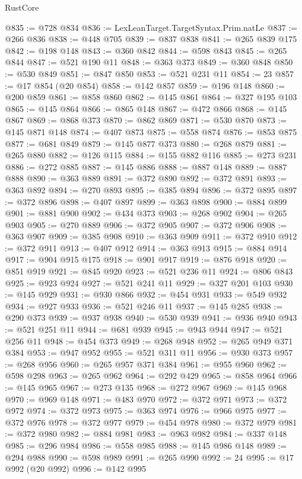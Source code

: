 \begin{lexlean}{RustCore}
\begin{coremodule}
@835 := @728 @834
@836 := LexLeanTarget.TargetSyntax.Prim.natLe
@837 := @266 @836
@838 := @448 @705
@839 := @837 @838
@841 := @265 @839 @175
@842 := @198 @148
@843 := @360 @842
@844 := @598 @843
@845 := @265 @844
@847 := @521 @190 @11
@848 := @363 @373
@849 := @360 @848
@850 := @530 @849
@851 := @847 @850
@853 := @521 @231 @11
@854 := 23
@857 := @17 @854 (@20 @854)
@858 := @142 @857
@859 := @196 @148
@860 := @200 @859
@861 := @858 @860
@862 := @145 @861
@864 := @327 @195 @103
@865 := @145 @864
@866 := @865 @148
@867 := @472 @866
@868 := @145 @867
@869 := @868 @373
@870 := @862 @869
@871 := @530 @870
@873 := @145 @871 @148
@874 := @407 @873
@875 := @558 @874
@876 := @853 @875
@877 := @681 @849
@879 := @145 @877 @373
@880 := @268 @879
@881 := @265 @880
@882 := @126 @115
@884 := @155 @882 @116
@885 := @273 @231
@886 := @272 @885
@887 := @145 @886
@888 := @887 @148
@889 := @887 @888
@890 := @363 @889
@891 := @372 @890
@892 := @372 @891
@893 := @363 @892
@894 := @270 @893
@895 := @385 @894
@896 := @372 @895
@897 := @372 @896
@898 := @407 @897
@899 := @363 @898
@900 := @884 @899
@901 := @881 @900
@902 := @434 @373
@903 := @268 @902
@904 := @265 @903
@905 := @270 @889
@906 := @372 @905
@907 := @372 @906
@908 := @363 @907
@909 := @385 @908
@910 := @363 @909
@911 := @372 @910
@912 := @372 @911
@913 := @407 @912
@914 := @363 @913
@915 := @884 @914
@917 := @904 @915 @175
@918 := @901 @917
@919 := @876 @918
@920 := @851 @919
@921 := @845 @920
@923 := @521 @236 @11
@924 := @806 @843
@925 := @923 @924
@927 := @521 @241 @11
@929 := @327 @201 @103
@930 := @145 @929
@931 := @930 @866
@932 := @454 @931
@933 := @549 @932
@934 := @927 @933
@936 := @521 @246 @11
@937 := @145 @285
@938 := @290 @373
@939 := @937 @938
@940 := @530 @939
@941 := @936 @940
@943 := @521 @251 @11
@944 := @681 @939
@945 := @943 @944
@947 := @521 @256 @11
@948 := @454 @373
@949 := @268 @948
@952 := @265 @949 @371 @384
@953 := @947 @952
@955 := @521 @311 @11
@956 := @930 @373
@957 := @268 @956
@960 := @265 @957 @371 @384
@961 := @955 @960
@962 := @598 @298
@963 := @265 @962
@964 := @292 @429
@965 := @858 @964
@966 := @145 @965
@967 := @273 @135
@968 := @272 @967
@969 := @145 @968
@970 := @969 @148
@971 := @483 @970
@972 := @372 @971
@973 := @372 @972
@974 := @372 @973
@975 := @363 @974
@976 := @966 @975
@977 := @372 @976
@978 := @372 @977
@979 := @454 @978
@980 := @372 @979
@981 := @372 @980
@982 := @884 @981
@983 := @963 @982
@984 := @337 @148
@985 := @296 @984
@986 := @558 @985
@988 := @145 @986 @148
@989 := @294 @988
@990 := @598 @989
@991 := @265 @990
@992 := 24
@995 := @17 @992 (@20 @992)
@996 := @142 @995

\end{coremodule}
\end{lexlean}
